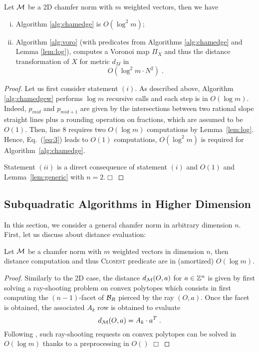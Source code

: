 \documentclass{llncs}
\begin{document}
\begin{theorem}
  Let $\mathcal{M}$ be a 2D chamfer norm with $m$ weighted vectors, then we
  have
  \begin{enumerate}[(i)]
  \item Algorithm     \ref{alg:chamedge} is   $O(\log^2{m})$\;;
  \item Algorithm \ref{alg:voro} (with predicates from Algorithms
    \ref{alg:chamedge} and Lemma \ref{lem:log}), computes a Voronoi
    map $\Pi_X$ and thus the distance transformation of $X$ for metric
    $d_{M}$ in
  \begin{equation}
    O( \log^2{m}\cdot N^2)\;.
  \end{equation}
  \end{enumerate}
\end{theorem}
\begin{proof}
Let us first consider statement $(i)$. As described above, Algorithm
\ref{alg:chamedgew} performs $\log{m}$ recursive calls and each step
is in $O(\log{m})$. Indeed, $p_{mid}$ and $p_{mid+1}$ are given by the
intersections between two rational slope straight lines plus a
rounding operation on fractions, which are assumed to be $O(1)$. Then,
line 8 requires two $O(\log{m})$ computations by
Lemma~\ref{lem:log}. Hence, Eq.~(\ref{eq:3}) leads to $O(1)$
computations, $O(\log^2{m})$ is required for
Algorithm~\ref{alg:chamedge}.

Statement $(ii)$ is a direct consequence of statement $(i)$ and
$O(1)$ and Lemma~\ref{lem:generic} with $n=2$.$\Box$
\end{proof}


\subsection{Subquadratic Algorithms in Higher Dimension}
\label{sec:subq-algor-high}
In this section, we consider a general chamfer norm in arbitrary
dimension $n$.  First, let us discuss about distance evaluation:
\begin{lemma}
   Let $\mathcal{M}$ be a chamfer norm with $m$ weighted vectors in dimension
  $n$, then distance computation and thus \textsc{Closest} predicate
  are in (amortized) $O(\log{m})$.
\end{lemma}
\begin{proof}
 Similarly to the 2D case, the distance $d_{\mathcal{M}}(O,a)$ for $a\in{\mathbb{Z}}^n$ is
 given by first solving a ray-shooting problem on convex polytopes
 which consists in first computing the $(n-1)$-facet of $\mathcal{B}_R$ pierced by the
 ray $(O,a)$. Once the facet is obtained, the associated $A_k$ row is
 obtained to evaluate
 \begin{displaymath}
   d_{\mathcal{M}}(O,a) = A_k\cdot a^T\;.
 \end{displaymath}
Following \cite{DBLP:journals/dcg/MatousekS93}, such ray-shooting
requests on convex polytopes can be solved in $O(\log{m})$ thanks to a
preprocessing in $O()$
  $\Box$
\end{proof}
\end{document}
